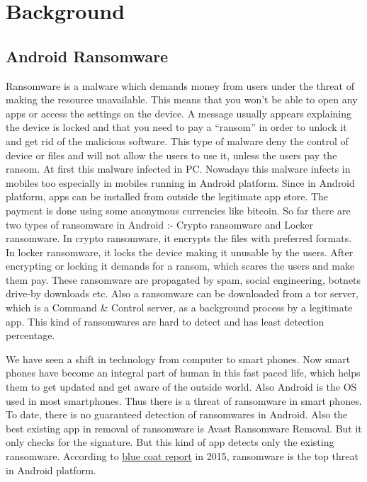 \chapter{Background}

\section{Android Ransomware}

Ransomware is a malware which demands money from users under the threat of making the resource unavailable.
This means that you won’t be able to open any apps or access the settings on the device.
A message usually appears explaining the device is locked and that you need to pay a “ransom” in order to unlock it and get rid of the malicious software.
This type of malware deny the control of device or files and will not allow the users to use it, unless the users pay the ransom. 
At first this malware infected in PC. 
Nowadays this malware infects in mobiles too especially in mobiles running in Android platform.
Since in Android platform, apps can be installed from outside the legitimate app store.
The payment is done using some anonymous currencies like bitcoin. 
So far there are two types of ransomware in Android :- Crypto ransomware and Locker ransomware.
In crypto ransomware, it encrypts the files with preferred formats.
In locker ransomware, it locks the device making it unusable by the users. 
After encrypting or locking it demands for a ransom, which scares the users and make them pay. 
These ransomware are propagated by spam, social engineering, botnets drive-by downloads etc. 
Also a ransomware can be downloaded from a tor server, which is a Command \& Control server, as a background process by a legitimate app. 
This kind of ransomwares are hard to detect and has least detection percentage.

\par We have seen a shift in technology from computer to smart phones. 
Now smart phones have become an integral part of human in this fast paced life, which helps them to get updated and get aware of the outside world. 
Also Android is the OS used in most smartphones. 
Thus there is a threat of ransomware in smart phones. 
To date, there is no guaranteed detection of ransomwares in Android. 
Also the best existing app in removal of ransomware is Avast Ransomware Removal. 
But it only checks for the signature. 
But this kind of app detects only the existing ransomware. 
According to \href{http://dc.bluecoat.com/Mobile_Malware_Report}{blue coat report} in 2015, ransomware is the top threat in Android platform.

